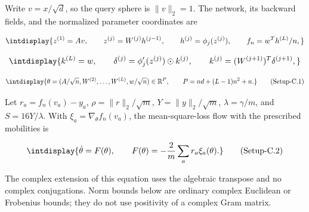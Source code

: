 
Write \(v=x/\sqrt d\), so the query sphere is \(\|v\|_2=1\). The network, its backward fields, and the normalized parameter coordinates are


\begingroup\renewcommand{\theHequation}{intdisplay.911}
\begin{equation*}
\intdisplay{
z^{(1)}=Av,\qquad z^{(j)}=W^{(j)}h^{(j-1)},\qquad
h^{(j)}=\phi_j(z^{(j)}),\qquad f_n=w^Th^{(L)}/n,
}
\end{equation*}
\endgroup

\begingroup\renewcommand{\theHequation}{intdisplay.912}
\begin{equation*}
\intdisplay{
k^{(L)}=w,\qquad
\delta^{(j)}=\phi_j'(z^{(j)})\odot k^{(j)},\qquad
k^{(j)}=(W^{(j+1)})^T\delta^{(j+1)},
}
\end{equation*}
\endgroup

\label{int:eq-setup-c-1}
\begingroup\renewcommand{\theHequation}{intdisplay.913}
\begin{equation}
\intdisplay{
\theta=(A/\sqrt n,W^{(2)},\ldots,W^{(L)},w/\sqrt n)
\in\mathbb R^P,\qquad P=nd+(L-1)n^2+n.
}
\tag{Setup-C.1}
\label{int:eq-0457-setup-c-1}
\end{equation}
\endgroup


Let \(r_a=f_n(v_a)-y_a\), \(\rho=\|r\|_2/\sqrt m\), \(Y=\|y\|_2/\sqrt m\), \(\lambda=\gamma/m\), and \(S=16Y/\lambda\). With \(\xi_a=\nabla_\theta f_n(v_a)\), the mean-square-loss flow with the prescribed mobilities is


\label{int:eq-setup-c-2}
\begingroup\renewcommand{\theHequation}{intdisplay.914}
\begin{equation}
\intdisplay{
\dot\theta=F(\theta),\qquad
F(\theta)=-\frac2m\sum_a r_a\xi_a(\theta).
}
\tag{Setup-C.2}
\label{int:eq-0458-setup-c-2}
\end{equation}
\endgroup


The complex extension of this equation uses the algebraic transpose and no complex conjugations. Norm bounds below are ordinary complex Euclidean or Frobenius bounds; they do not use positivity of a complex Gram matrix.



